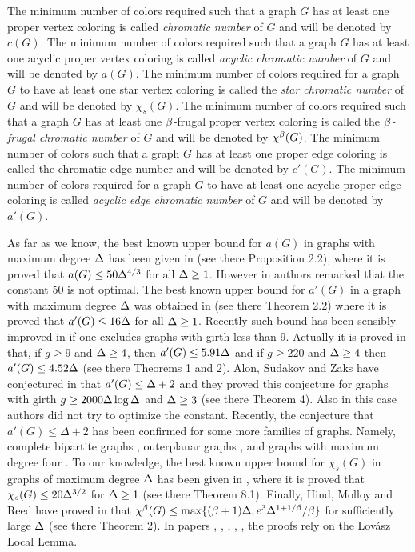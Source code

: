 \documentclass[11pt]{article}
\begin{document}
The minimum number of colors required such that a graph $G$ has
at least one proper vertex coloring is called {\it chromatic number} of $G$ and will be denoted by $c(G)$.
The minimum number of colors required such that a graph $G$ has
at least one acyclic proper vertex coloring is called {\it acyclic chromatic number} of $G$ and will be denoted by $a(G)$.
The minimum number of colors required for a graph $G$ to have
at least one star vertex coloring is called the {\it star  chromatic number} of $G$ and will be denoted by $\chi_s(G)$.
The minimum number of colors required such that a graph $G$ has
at least one $\beta$-frugal proper vertex coloring is called the {\it $\beta$-frugal chromatic number} of $G$ and
will be denoted by $\chi^\beta(G)$. The minimum number of colors such that a graph $G$ has
at least  one proper edge coloring is called the chromatic edge number  and
will be denoted by $c'(G)$.
The minimum number of colors required for  a graph $G$ to have
at least one acyclic proper edge coloring is called {\it acyclic edge chromatic number} of $G$ and will
be denoted by $a'(G)$.



As far as we know, the best known upper bound for $a(G)$ in graphs with maximum degree $\Delta$ has been given in \cite{AMR} (see there Proposition 2.2),
where it is proved that
$a(G)\le 50 \Delta^{4/3}$ for all $\Delta\ge1$.  However in \cite{AMR} authors  remarked that the constant 50  is not optimal.
The best known upper bound for $a'(G)$
in a graph with maximum degree $\Delta$ was obtained in \cite{MR} (see there Theorem 2.2)  where it is proved that $a'(G)\le 16\Delta$ for all $\Delta\ge 1$.  Recently
such bound has been sensibly improved in \cite{MNS} if one excludes graphs with girth less than  9. Actually  it is proved in \cite{MNS}
 that, if  $g\ge 9$ and $\Delta\ge 4$, then $a'(G)\le 5.91\Delta$   and if $g\ge 220$ and $\Delta\ge 4$ then  $a'(G)\le 4.52\Delta$ (see there Theorems 1 and 2).
Alon, Sudakov and Zaks have conjectured
in \cite{ASZ} that $a'(G)\le \Delta+2$ and they proved this conjecture
for graphs with girth $g\ge 2000\Delta\log\Delta$ and $\Delta\ge 3$ (see there Theorem 4).  Also  in this  case authors did not try to optimize  the constant.
Recently,
the conjecture that $a'(G)\le \Delta + 2$  has been confirmed for some more families of graphs.
Namely, complete bipartite graphs \cite{BS},
outerplanar graphs \cite{MNS2},  and graphs with maximum degree four \cite{BS2}.
To our knowledge, the best known upper bound for $\chi_s(G)$ in graphs of maximum degree $\Delta$ has been
given in \cite{FRR}, where it is proved that
$\chi_s(G)\le 20 \Delta^{3/2}$ for $\Delta\ge 1$ (see there Theorem 8.1).
Finally, Hind, Molloy and Reed have proved in \cite{HMR} that
 $\chi^\beta(G)\le \max\{(\beta+1)\Delta, e^3{\Delta^{1+1/\beta}/ \beta}\}$ for sufficiently large $\Delta$ (see there Theorem 2). In papers \cite{AMR}, \cite{ASZ}, \cite{FRR}, \cite{HMR}, \cite{MR}, \cite{MNS}
 the proofs rely on the Lov\'asz Local Lemma.
\end{document}
